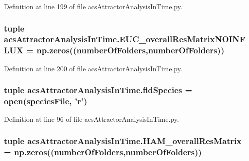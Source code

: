 Definition at line 199 of file acs\-Attractor\-Analysis\-In\-Time.\-py.

\hypertarget{a00097_a4f2ecc559d2c5d79bb138a2e8ced8127}{
\subsubsection[{E\-U\-C\-\_\-overall\-Res\-Matrix\-N\-O\-I\-N\-F\-L\-U\-X}]{\setlength{\rightskip}{0pt plus 5cm}tuple acs\-Attractor\-Analysis\-In\-Time.\-E\-U\-C\-\_\-overall\-Res\-Matrix\-N\-O\-I\-N\-F\-L\-U\-X = np.\-zeros(({\bf number\-Of\-Folders},{\bf number\-Of\-Folders}))}}\label{a00097_a4f2ecc559d2c5d79bb138a2e8ced8127}


Definition at line 200 of file acs\-Attractor\-Analysis\-In\-Time.\-py.

\hypertarget{a00097_a70d70b9ab98e722475b03465c7f8dbbe}{
\subsubsection[{fid\-Species}]{\setlength{\rightskip}{0pt plus 5cm}tuple acs\-Attractor\-Analysis\-In\-Time.\-fid\-Species = open({\bf species\-File}, '{\bf r}')}}\label{a00097_a70d70b9ab98e722475b03465c7f8dbbe}


Definition at line 96 of file acs\-Attractor\-Analysis\-In\-Time.\-py.

\hypertarget{a00097_a5e8d5d65865736555e76c3f04058ddd9}{
\subsubsection[{H\-A\-M\-\_\-overall\-Res\-Matrix}]{\setlength{\rightskip}{0pt plus 5cm}tuple acs\-Attractor\-Analysis\-In\-Time.\-H\-A\-M\-\_\-overall\-Res\-Matrix = np.\-zeros(({\bf number\-Of\-Folders},{\bf number\-Of\-Folders}))}}\label{a00097_a5e8d5d65865736555e76c3f04058ddd9}


